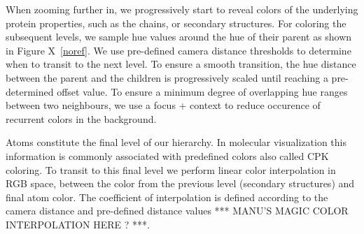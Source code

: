 \documentclass[review,journal]{vgtc}         %
\begin{document}
When zooming further in, we progressively start to reveal colors of the underlying protein properties, such as the chains, or secondary structures.
For coloring the subsequent levels, we sample hue values around the hue of their parent as shown in Figure X~\ref{noref}.
We use pre-defined camera distance thresholds to determine when to transit to the next level.
To ensure a smooth transition, the hue distance between the parent and the children is progressively scaled until reaching a pre-determined offset value.
To ensure a minimum degree of overlapping hue ranges between two neighbours, we use a focus + context to reduce occurence of recurrent colors in the background.

Atoms constitute the final level of our hierarchy.
In molecular visualization this information is commonly associated with predefined colors also called CPK coloring.
To transit to this final level we perform linear color interpolation in RGB space, between the color from the previous level (secondary structures) and final atom color.
The coefficient of interpolation is defined according to the camera distance and pre-defined distance values *** MANU'S MAGIC COLOR INTERPOLATION HERE ? ***.

%
%
%
%
%
\end{document}
